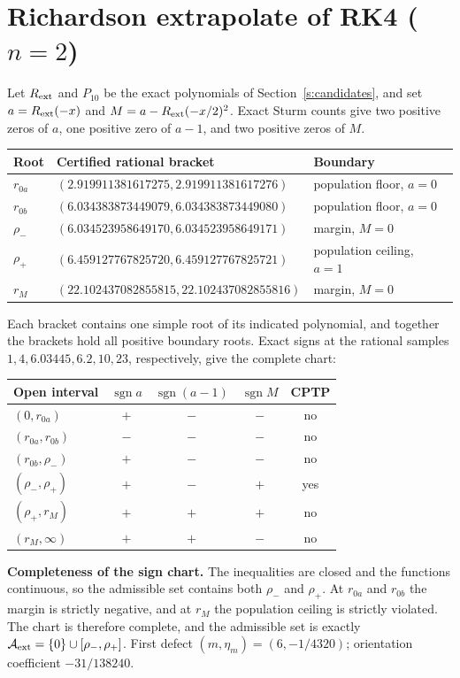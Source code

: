 \documentclass[11pt]{article}
\providecommand{\texorpdfstring}[2]{#1}
\begin{document}
\section{Richardson extrapolate of RK4 (\texorpdfstring{$n=2$}{n=2})}\label{s:richardson_chart}
Let $R_{\rm ext}$ and $P_{10}$ be the exact polynomials of Section~\ref{s:candidates}, and set $a=R_{\rm ext}(-x)$ and $M=a-R_{\rm ext}(-x/2)^2$. Exact Sturm counts give two positive zeros of $a$, one positive zero of $a-1$, and two positive zeros of $M$.
\begin{center}
\begin{tabular}{@{}lll@{}}
\toprule
Root & Certified rational bracket & Boundary \\
\midrule
$r_{0a}$ & $(2.919911381617275,2.919911381617276)$ & population floor, $a=0$ \\
$r_{0b}$ & $(6.034383873449079,6.034383873449080)$ & population floor, $a=0$ \\
$\rho_-$ & $(6.034523958649170,6.034523958649171)$ & margin, $M=0$ \\
$\rho_+$ & $(6.459127767825720,6.459127767825721)$ & population ceiling, $a=1$ \\
$r_M$ & $(22.102437082855815,22.102437082855816)$ & margin, $M=0$ \\
\bottomrule
\end{tabular}
\end{center}
Each bracket contains one simple root of its indicated polynomial, and together the brackets hold all positive boundary roots. Exact signs at the rational samples $1,4,6.03445,6.2,10,23$, respectively, give the complete chart:
\begin{center}
\begin{tabular}{@{}lcccc@{}}
\toprule
Open interval & $\operatorname{sgn}a$ & $\operatorname{sgn}(a-1)$ & $\operatorname{sgn}M$ & CPTP \\
\midrule
$(0,r_{0a})$ & $+$ & $-$ & $-$ & no \\
$(r_{0a},r_{0b})$ & $-$ & $-$ & $-$ & no \\
$(r_{0b},\rho_-)$ & $+$ & $-$ & $-$ & no \\
$(\rho_-,\rho_+)$ & $+$ & $-$ & $+$ & yes \\
$(\rho_+,r_M)$ & $+$ & $+$ & $+$ & no \\
$(r_M,\infty)$ & $+$ & $+$ & $-$ & no \\
\bottomrule
\end{tabular}
\end{center}
\textbf{Completeness of the sign chart.} The inequalities are closed and the functions continuous, so the admissible set contains both $\rho_-$ and $\rho_+$. At $r_{0a}$ and $r_{0b}$ the margin is strictly negative, and at $r_M$ the population ceiling is strictly violated. The chart is therefore complete, and the admissible set is exactly $\mathcal A_{\rm ext}=\{0\}\cup[\rho_-,\rho_+]$. First defect $(m,\eta_m)=(6,-1/4320)$; orientation coefficient $-31/138240$.
\end{document}
